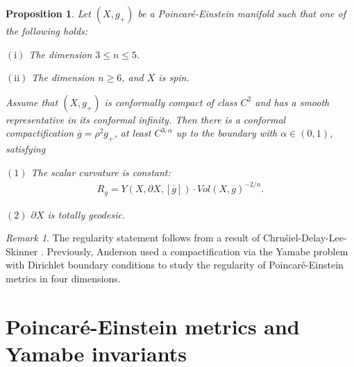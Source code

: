 \documentclass{amsart}
\newtheorem{proposition}[theorem]{Proposition}
\theoremstyle{definition}
\theoremstyle{remark}
\newtheorem{remark}[theorem]{Remark}
\numberwithin{equation}{section}
\begin{document}
\begin{proposition}  \label{YPprop}  Let $(X, g_{+})$ be a Poincar\'e-Einstein manifold such that one of the following holds:

\smallskip

$\mathrm{(i)}$ The dimension $3 \leq n \leq 5$.


$\mathrm{(ii)}$ The dimension $n \geq 6$, and $X$ is spin.

\smallskip
\noindent
Assume that $(X,g_{+})$ is conformally compact of class $C^2$ and has a smooth representative in its conformal infinity.
Then there is a conformal compactification $\overline{g} = \rho^2 g_{+}$, at least $C^{3,\alpha}$ up to the boundary with $\alpha \in (0,1)$, satisfying

\smallskip
$\mathrm{(1)}$ The scalar curvature is constant:
\begin{align*}
R_{\overline{g}} = Y(X,\partial X,[\overline{g}]) \cdot Vol(X,\overline{g})^{-2/n}.
\end{align*}

$\mathrm{(2)}$ $\partial X$ is totally geodesic.
\end{proposition}


\begin{remark} The regularity statement follows from a result of Chru\'siel-Delay-Lee-Skinner \cite{CDLS}.   Previously, Anderson \cite{AndersonAM} used a compactification via the Yamabe problem with Dirichlet boundary conditions \cite{Ma} to study the regularity of Poincar\'e-Einstein metrics in four dimensions. \end{remark}


%
\section{Poincar\'e-Einstein metrics and Yamabe invariants}  \label{SecMainThm}
%
\end{document}
